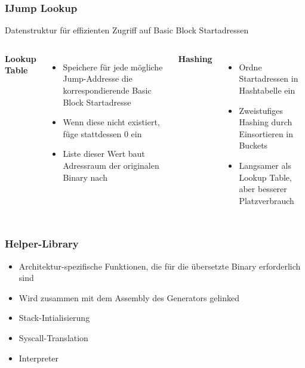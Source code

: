 
\begin{frame}
    \frametitle{IJump Lookup}{Datenstruktur für effizienten Zugriff auf Basic Block Startadressen}
    \vspace{1cm}
    \begin{columns}[t]
        \textbf{Lookup Table}
        \begin{itemize}
            \vspace{1em}
            \setlength{\itemsep}{1em}
            \item Speichere für jede mögliche Jump-Addresse die korrespondierende Basic Block Startadresse
            \item Wenn diese nicht existiert, füge stattdessen 0 ein
            \item Liste dieser Wert baut Adressraum der originalen Binary nach
        \end{itemize}
        \textbf{Hashing}
        \begin{itemize}
            \vspace{1em}
            \setlength{\itemsep}{1em}
            \item Ordne Startadressen in Hashtabelle ein
            \item Zweistufiges Hashing durch Einsortieren in Buckets
            \item Langsamer als Lookup Table, aber besserer Platzverbrauch
        \end{itemize}
    \end{columns}
\end{frame}
\clearpage

\begin{frame}
    \frametitle{Helper-Library}

    \begin{itemize}
        \setlength{\itemsep}{1em}
        \item Architektur-spezifische Funktionen, die für die übersetzte Binary erforderlich sind
        \item Wird zusammen mit dem Assembly des Generators gelinked
        \item Stack-Intialisierung
        \item Syscall-Translation
        \item Interpreter
    \end{itemize}
\end{frame}
\clearpage

